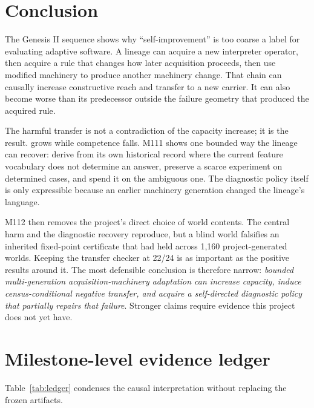 \section{Conclusion}
The Genesis II sequence shows why ``self-improvement'' is too coarse a label for evaluating adaptive software. A lineage can acquire a new interpreter operator, then acquire a rule that changes how later acquisition proceeds, then use modified machinery to produce another machinery change. That chain can causally increase constructive reach and transfer to a new carrier. It can also become worse than its predecessor outside the failure geometry that produced the acquired rule.

The harmful transfer is not a contradiction of the capacity increase; it is the result. \reach grows while competence falls. M111 shows one bounded way the lineage can recover: derive from its own historical record where the current feature vocabulary does not determine an answer, preserve a scarce experiment on determined cases, and spend it on the ambiguous one. The diagnostic policy itself is only expressible because an earlier machinery generation changed the lineage's language.

M112 then removes the project's direct choice of world contents. The central harm and the diagnostic recovery reproduce, but a blind world falsifies an inherited fixed-point certificate that had held across 1,160 project-generated worlds. Keeping the transfer checker at 22/24 is as important as the positive results around it. The most defensible conclusion is therefore narrow: \emph{bounded multi-generation acquisition-machinery adaptation can increase capacity, induce census-conditional negative transfer, and acquire a self-directed diagnostic policy that partially repairs that failure}. Stronger claims require evidence this project does not yet have.

\appendix
\section{Milestone-level evidence ledger}
\label{app:ledger}
Table~\ref{tab:ledger} condenses the causal interpretation without replacing the frozen artifacts.

